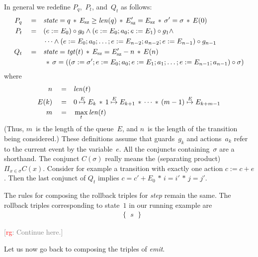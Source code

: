 \documentclass{article} %
\newcommand{\3}[3]{\{\,#1\,\}\;#2\;\{\,#3\,\}}
\newcommand{\eto}{\stackrel E\mapsto}
\renewcommand{\*}{\,*\,}
\newcommand{\noterg}[2]{\textcolor{gray}{[\textcolor{red}{#1}: #2]}}
\newcommand{\rg}[1]{\noterg{rg}{#1}}
\begin{document}
In general we redefine $P_q$,~$P_t$, and~$Q_t$ as follows:
\begin{align*}
P_q \quad=\quad &{\it state}=q \* E_{\rm sz}\ge{\it len}(q)
  \* E'_{\rm sz}=E_{\rm sz} \* \sigma'=\sigma \* E(0) \\
P_t \quad=\quad
  &(e:=E_0)\circ g_0
  \land (e:=E_0;a_0;e:=E_1)\circ g_1 \land \\
  &\cdots
  \land (e:=E_0;a_0;\ldots;e:=E_{n-2};a_{n-2};e:=E_{n-1})\circ g_{n-1} \\
Q_t \quad=\quad
  &{\it state}={\it tgt}(t) \* E_{\rm sz}=E'_{\rm sz}-n \* E(n) \\
  &\* \sigma=((\sigma:=\sigma';e:=E_0;a_0;e:=E_1;a_1;\ldots;e:=E_{n-1};a_{n-1})\circ\sigma)
\end{align*}
where
\begin{align*}
n \quad=\quad &{\it len}(t) \\
E(k) \quad=\quad &0\eto E_k \* 1\eto E_{k+1} \* \cdots \* (m-1)\eto E_{k+m-1} \\
m \quad=\quad &\max_t {\it len}(t)
\end{align*}
(Thus, $m$~is the length of the queue~$E$, and $n$~is the length of the transition being considered.)
These definitions assume that guards~$g_k$ and actions~$a_k$ refer to the current event by the variable~$e$.
All the conjuncts containing~$\sigma$ are a shorthand.
The conjunct $C(\sigma)$ really means the (separating product) $\Pi_{x\in\sigma} C(x)$.
Consider for example a transition with exactly one action $c:=c+e$.
Then the last conjunct of $Q_t$ implies $c=c'+E_0 \* i=i' \* j=j'$.

The rules for composing the rollback triples for {\it step\/} remain the same.
The rollback triples corresponding to state~$1$ in our running example are
{\def\pq{{\it state}=1 \* E_{\rm sz}\ge2 \* E'_{\rm sz}=E_{\rm sz} * }
\begin{align*}
&\left\{\begin{aligned}
s
\end{aligned}\right\}
\end{align*}}

\rg{Continue here.}

\medskip

Let us now go back to composing the triples of {\it emit}.
\end{document}

